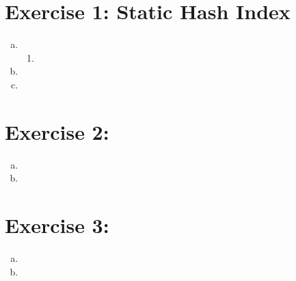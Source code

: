 \documentclass[a4paper]{article}
\begin{document}
	\section*{Exercise 1: Static Hash Index}\label{sec:exercise1}
   \begin{enumerate}[a.]
		\item 
            \begin{enumerate}
                \item 
            \end{enumerate}
        \item
        \item
   \end{enumerate}

	\section*{Exercise 2: }\label{sec:exercise2}
        \begin{enumerate}[a.]
            \item
            \item
        \end{enumerate}


	\section*{Exercise 3: }\label{sec:exercise3}
	\begin{enumerate}[a.]
        \item 
        \item 
    \end{enumerate}
\end{document}
